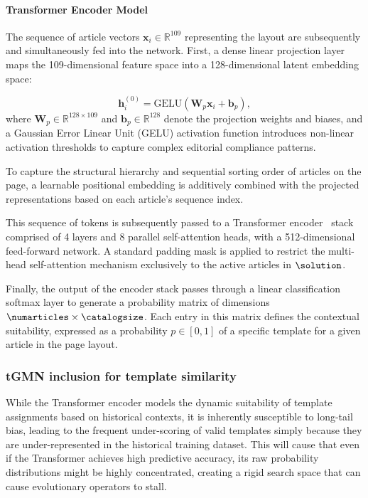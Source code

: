 \paragraph{Transformer Encoder Model}

The sequence of article vectors $\mathbf{x}_i \in \mathbb{R}^{109}$ representing the layout are subsequently and simultaneously fed into the network. First, a dense linear projection layer maps the 109-dimensional feature space into a 128-dimensional latent embedding space:

\begin{equation}
\mathbf{h}_i^{(0)} = \text{GELU}(\mathbf{W}_p \mathbf{x}_i + \mathbf{b}_p),
\end{equation}
where $\mathbf{W}_p \in \mathbb{R}^{128 \times 109}$ and $\mathbf{b}_p \in \mathbb{R}^{128}$ denote the projection weights and biases, and a Gaussian Error Linear Unit (GELU) activation function introduces non-linear activation thresholds to capture complex editorial compliance patterns. 


To capture the structural hierarchy and sequential sorting order of articles on the page, a learnable positional embedding is additively combined with the projected representations based on each article's sequence index.

This sequence of tokens is subsequently passed to a Transformer encoder~\cite{attention} stack comprised of 4 layers and 8 parallel self-attention heads, with a 512-dimensional feed-forward network. A standard padding mask is applied to restrict the multi-head self-attention mechanism exclusively to the active articles in $\solution$.

Finally, the output of the encoder stack passes through a linear classification softmax layer to generate a probability matrix of dimensions $\numarticles \times \catalogsize$. Each entry in this matrix defines the contextual suitability, expressed as a probability $p\in[0,1]$ of a specific template for a given article in the page layout. 

\subsubsection{tGMN inclusion for template similarity}
\label{sec:gwes-gmn-mapping}

While the Transformer encoder models the dynamic suitability of template assignments based on historical contexts, it is inherently susceptible to long-tail bias, leading to the frequent under-scoring of valid templates simply because they are under-represented in the historical training dataset. This will cause that even if the Transformer achieves high predictive accuracy, its raw probability distributions might be highly concentrated, creating a rigid search space that can cause evolutionary operators to stall. 

